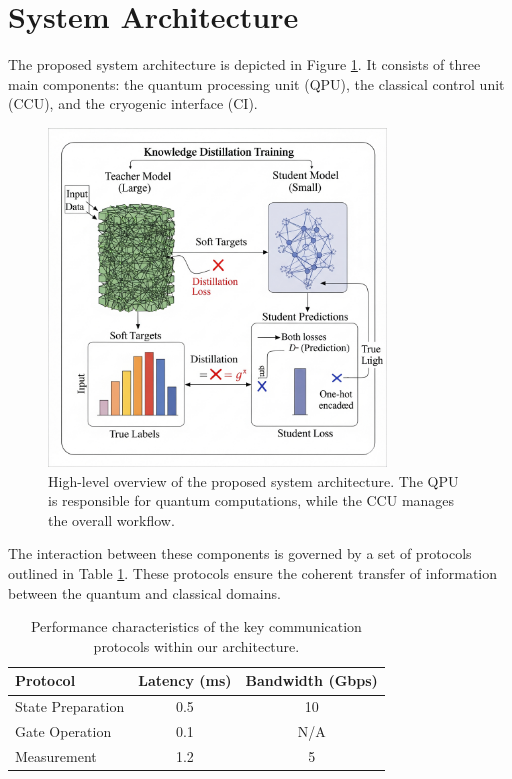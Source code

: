 \section{System Architecture}
The proposed system architecture is depicted in Figure \ref{fig:system_overview}. It consists of three main components: the quantum processing unit (QPU), the classical control unit (CCU), and the cryogenic interface (CI).

\begin{figure}[h!]
    \centering
    \includegraphics[width=0.8\textwidth]{figures/example_figure.png}
    \caption{High-level overview of the proposed system architecture. The QPU is responsible for quantum computations, while the CCU manages the overall workflow.}
    \label{fig:system_overview}
\end{figure}

The interaction between these components is governed by a set of protocols outlined in Table \ref{tab:protocols}. These protocols ensure the coherent transfer of information between the quantum and classical domains.

\begin{table}[h!]
    \centering
    \begin{tabular}{|l|c|c|}
        \hline
        \textbf{Protocol} & \textbf{Latency (ms)} & \textbf{Bandwidth (Gbps)} \\
        \hline
        State Preparation & 0.5 & 10 \\
        Gate Operation & 0.1 & N/A \\
        Measurement & 1.2 & 5 \\
        \hline
    \end{tabular}
    \caption{Performance characteristics of the key communication protocols within our architecture.}
    \label{tab:protocols}
\end{table}

